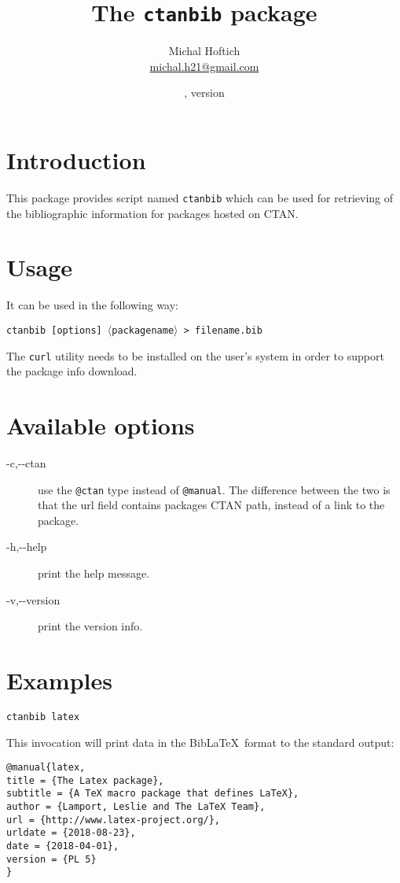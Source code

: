 \documentclass{ltxdoc}
\title{The \texttt{ctanbib} package}
\author{Michal Hoftich\\\url{michal.h21@gmail.com}}
\date{\gitdate, version \gitversion}
\newcommand\package[1]{\texttt{#1}}
\begin{document}
\maketitle

\section{Introduction}
This package provides script named \package{ctanbib} which can be used for retrieving of the bibliographic information for packages hosted on CTAN.


\section{Usage}


It can be used in the following way:


\noindent\package{ctanbib [options]  $\langle$packagename$\rangle$ > filename.bib}

The \texttt{curl} utility needs to be installed on the user's system in order to support the package info download.


\section{Available options}

\begin{description}
  \item[-c,-\/-ctan] use the \texttt{@ctan} type instead of \texttt{@manual}.
    The difference between the two is that the url field contains packages CTAN
    path, instead of a link to the package.
  \item[-h,-\/-help] print the help message.
  \item[-v,-\/-version] print the version info.
\end{description}


\section{Examples}

\begin{verbatim}
ctanbib latex  
\end{verbatim}


\noindent This invocation will print data in the Bib\LaTeX\ format to the standard output:

\begin{verbatim}
@manual{latex,
title = {The Latex package},
subtitle = {A TeX macro package that defines LaTeX},
author = {Lamport, Leslie and The LaTeX Team},
url = {http://www.latex-project.org/},
urldate = {2018-08-23}, 
date = {2018-04-01},
version = {PL 5}
}
\end{verbatim}
\end{document}
